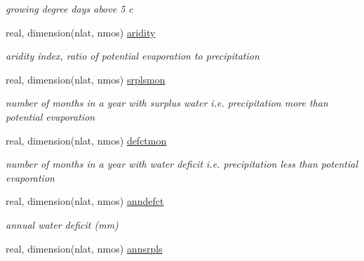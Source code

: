 \begin{DoxyCompactItemize}
\begin{DoxyCompactList}\small\item\em growing degree days above 5 c \end{DoxyCompactList}\item 
\hypertarget{structctem__statevars_1_1veg__rot_a5e65e82e9dcf6376728626ec8816d7f0}{}real, dimension(nlat, nmos) \hyperlink{structctem__statevars_1_1veg__rot_a5e65e82e9dcf6376728626ec8816d7f0}{aridity}\label{structctem__statevars_1_1veg__rot_a5e65e82e9dcf6376728626ec8816d7f0}

\begin{DoxyCompactList}\small\item\em aridity index, ratio of potential evaporation to precipitation \end{DoxyCompactList}\item 
\hypertarget{structctem__statevars_1_1veg__rot_a7e47bb1275883daf396f8895544df1c1}{}real, dimension(nlat, nmos) \hyperlink{structctem__statevars_1_1veg__rot_a7e47bb1275883daf396f8895544df1c1}{srplsmon}\label{structctem__statevars_1_1veg__rot_a7e47bb1275883daf396f8895544df1c1}

\begin{DoxyCompactList}\small\item\em number of months in a year with surplus water i.\+e. precipitation more than potential evaporation \end{DoxyCompactList}\item 
\hypertarget{structctem__statevars_1_1veg__rot_ab9bc71b3863d6336736fd28e18caed2b}{}real, dimension(nlat, nmos) \hyperlink{structctem__statevars_1_1veg__rot_ab9bc71b3863d6336736fd28e18caed2b}{defctmon}\label{structctem__statevars_1_1veg__rot_ab9bc71b3863d6336736fd28e18caed2b}

\begin{DoxyCompactList}\small\item\em number of months in a year with water deficit i.\+e. precipitation less than potential evaporation \end{DoxyCompactList}\item 
\hypertarget{structctem__statevars_1_1veg__rot_a71bdbd015fa70ebf97e4732ec0bf0b80}{}real, dimension(nlat, nmos) \hyperlink{structctem__statevars_1_1veg__rot_a71bdbd015fa70ebf97e4732ec0bf0b80}{anndefct}\label{structctem__statevars_1_1veg__rot_a71bdbd015fa70ebf97e4732ec0bf0b80}

\begin{DoxyCompactList}\small\item\em annual water deficit (mm) \end{DoxyCompactList}\item 
\hypertarget{structctem__statevars_1_1veg__rot_a3aab440add68ccbda6cda9514827452e}{}real, dimension(nlat, nmos) \hyperlink{structctem__statevars_1_1veg__rot_a3aab440add68ccbda6cda9514827452e}{annsrpls}\label{structctem__statevars_1_1veg__rot_a3aab440add68ccbda6cda9514827452e}


\end{DoxyCompactItemize}
